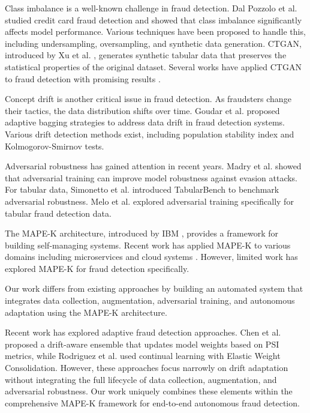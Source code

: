 \documentclass{svproc}
\begin{document}
Class imbalance is a well-known challenge in fraud detection. Dal Pozzolo et al. \cite{dalpozzolo2015credit} studied credit card fraud detection and showed that class imbalance significantly affects model performance. Various techniques have been proposed to handle this, including undersampling, oversampling, and synthetic data generation. CTGAN, introduced by Xu et al. \cite{xu2019ctgan}, generates synthetic tabular data that preserves the statistical properties of the original dataset. Several works have applied CTGAN to fraud detection with promising results \cite{strelcenia2023synthetic}.

Concept drift is another critical issue in fraud detection. As fraudsters change their tactics, the data distribution shifts over time. Goudar et al. \cite{goudar2026adaptive} proposed adaptive bagging strategies to address data drift in fraud detection systems. Various drift detection methods exist, including population stability index and Kolmogorov-Smirnov tests.

Adversarial robustness has gained attention in recent years. Madry et al. \cite{madry2018adversarial} showed that adversarial training can improve model robustness against evasion attacks. For tabular data, Simonetto et al. \cite{simonetto2024tabularbench} introduced TabularBench to benchmark adversarial robustness. Melo et al. \cite{melo2023adversarial} explored adversarial training specifically for tabular fraud detection data.

The MAPE-K architecture, introduced by IBM \cite{ibm2005autonomic}, provides a framework for building self-managing systems. Recent work has applied MAPE-K to various domains including microservices \cite{bucchiarone2022mape} and cloud systems \cite{oh2023mape}. However, limited work has explored MAPE-K for fraud detection specifically.

Our work differs from existing approaches by building an automated system that integrates data collection, augmentation, adversarial training, and autonomous adaptation using the MAPE-K architecture.

Recent work has explored adaptive fraud detection approaches. Chen et al. \cite{chen2024adaptive} proposed a drift-aware ensemble that updates model weights based on PSI metrics, while Rodriguez et al. \cite{rodriguez2023continual} used continual learning with Elastic Weight Consolidation. However, these approaches focus narrowly on drift adaptation without integrating the full lifecycle of data collection, augmentation, and adversarial robustness. Our work uniquely combines these elements within the comprehensive MAPE-K framework for end-to-end autonomous fraud detection.
\end{document}
